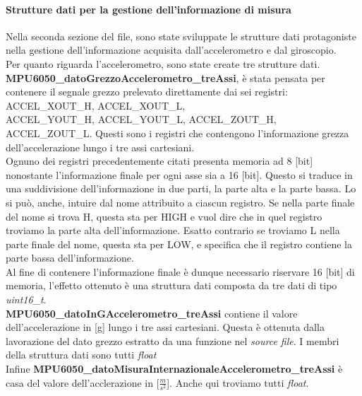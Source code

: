 \documentclass[11pt]{report}
\begin{document}
\paragraph{Strutture dati per la gestione dell'informazione di misura}
Nella seconda sezione del file, sono state sviluppate le strutture dati protagoniste nella gestione dell'informazione acquisita dall'accelerometro e dal giroscopio.\\
Per quanto riguarda l'accelerometro, sono state create tre strutture dati.\\
\textbf{MPU6050\_datoGrezzoAccelerometro\_treAssi}, è stata pensata per contenere il segnale grezzo prelevato direttamente dai sei registri: ACCEL\_XOUT\_H, ACCEL\_XOUT\_L,\\ACCEL\_YOUT\_H, ACCEL\_YOUT\_L, ACCEL\_ZOUT\_H, ACCEL\_ZOUT\_L. Questi sono i registri che contengono l'informazione grezza dell'accelerazione lungo i tre assi 
cartesiani.\\
Ognuno dei registri precedentemente citati presenta memoria ad 8 [bit] nonostante l'informazione finale per ogni asse sia a 16 [bit]. Questo si traduce in una suddivisione  dell'informazione in due parti, la parte alta e la parte bassa. Lo si può, anche, intuire dal nome attribuito a ciascun registro. Se nella parte finale del nome si trova H, questa sta per HIGH e vuol dire che in quel registro troviamo la parte alta dell'informazione. Esatto contrario se troviamo L nella parte finale del nome, questa sta per LOW, e specifica che il registro contiene la parte bassa dell'informazione.\\
Al fine di contenere l'informazione finale è dunque necessario riservare 16 [bit] di memoria, l'effetto ottenuto è una struttura dati composta da tre dati di tipo \textit{uint16\_t}.\\
\textbf{MPU6050\_datoInGAccelerometro\_treAssi} contiene il valore dell'accelerazione in [g] lungo i tre assi cartesiani. Questa è ottenuta dalla lavorazione del dato grezzo estratto da una funzione nel \textit{source file}. I membri della struttura dati sono tutti \textit{float}\\
Infine \textbf{MPU6050\_datoMisuraInternazionaleAccelerometro\_treAssi} è casa del valore dell'acclerazione in [$\frac{m}{s^2}$]. Anche qui troviamo tutti \textit{float}.
\newpage

\end{document}
